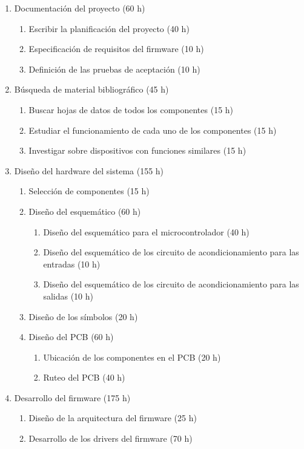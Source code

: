 \documentclass[
11pt, %
codirector, %
]{charter}
\begin{document}
\begin{enumerate}
\item Documentación del proyecto (60 h)
	\begin{enumerate}
	\item Escribir la planificación del proyecto (40 h)
	\item Especificación de requisitos del firmware (10 h)
	\item Definición de las pruebas de aceptación (10 h)
	\end{enumerate}
\item Búsqueda de material bibliográfico  (45 h)
	\begin{enumerate}
	\item Buscar hojas de datos de todos los componentes (15 h)
	\item Estudiar el funcionamiento de cada uno de los componentes (15 h)
	\item Investigar sobre dispositivos con funciones similares (15 h)
	\end{enumerate}
\item Diseño del hardware del sistema (155 h)
	\begin{enumerate}
	\item Selección de componentes (15 h)
	\item Diseño del esquemático (60 h)
	\begin{enumerate}
		\item Diseño del esquemático para el microcontrolador (40 h)
		\item Diseño del esquemático de los circuito de acondicionamiento para las entradas (10 h)
		\item Diseño del esquemático de los circuito de acondicionamiento para las salidas (10 h)
	\end{enumerate}
	\item Diseño de los símbolos (20 h)
	\item Diseño del PCB (60 h)
	\begin{enumerate}
		\item Ubicación de los componentes en el PCB (20 h)
		\item Ruteo del PCB (40 h)
	\end{enumerate}
	\end{enumerate}
\item Desarrollo del firmware (175 h)
	\begin{enumerate}
	\item Diseño de la arquitectura del firmware (25 h)
	\item Desarrollo de los drivers del firmware (70 h)

\end{enumerate}
\end{enumerate}
\end{document}
